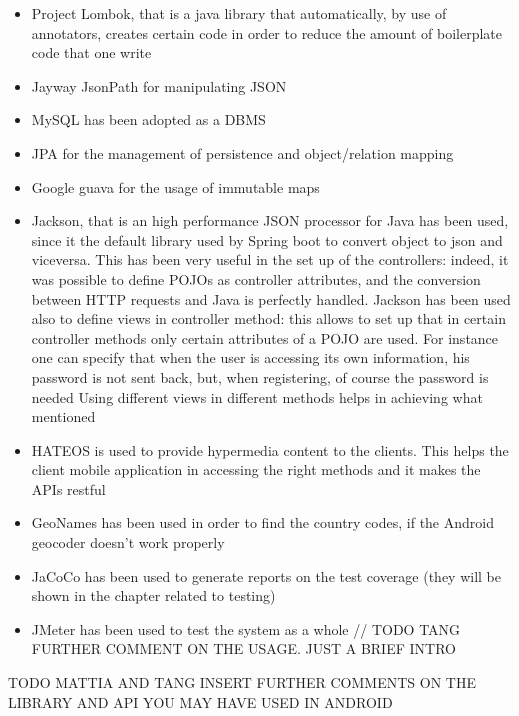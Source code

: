 \begin{itemize}
\item Project Lombok, that is a java library that automatically, by use of annotators, creates certain code in order to reduce the amount
of boilerplate code that one write 
\item Jayway JsonPath for manipulating JSON 
\item MySQL has been adopted as a DBMS
\item JPA for the management of persistence and object/relation mapping
\item Google guava for the usage of immutable maps
\item Jackson, that is an high performance JSON processor for Java has been used, since it the default library used by Spring boot 
to convert object to json and viceversa. 
This has been very useful in the set up of the controllers: indeed, it was possible to define POJOs as controller attributes, and the conversion between HTTP requests and Java is perfectly handled. 
Jackson has been used also to define views in controller method: this allows to set up that in certain controller methods only certain attributes of a POJO are used. 
For instance one can specify that when the user is accessing its own information, his password is not sent back, but, when registering, of course the password is needed
Using different views in different methods helps in achieving what mentioned 
\item HATEOS is used to provide hypermedia content to the clients. This helps the client mobile application in accessing the right methods 
and it makes the APIs restful
\item GeoNames has been used in order to find the country codes, if the Android geocoder doesn't work properly
\item JaCoCo has been used to generate reports on the test coverage (they will be shown in the chapter related to testing)
\item JMeter has been used to test the system as a whole // TODO TANG FURTHER COMMENT ON THE USAGE. JUST A BRIEF INTRO
\end{itemize}

TODO MATTIA AND TANG INSERT FURTHER COMMENTS ON THE LIBRARY AND API YOU MAY HAVE USED IN ANDROID